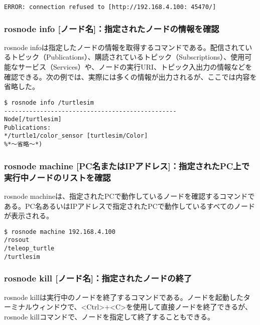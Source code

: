 \begin{lstlisting}[language=ROS]
ERROR: connection refused to [http://192.168.4.100: 45470/]
\end{lstlisting}

\subsubsection{rosnode info [ノード名]：指定されたノードの情報を確認}

rosnode infoは指定したノードの情報を取得するコマンドである。配信されているトピック（Publications）、購読されているトピック（Subscriptions）、使用可能なサービス（Services）や、ノードの実行URI、トピック入出力の情報などを確認できる。次の例では、実際には多くの情報が出力されるが、ここでは内容を省略した。

\begin{lstlisting}[language=ROS]
$ rosnode info /turtlesim
------------------------------------------------
Node[/turtlesim]
Publications:
*/turtle1/color_sensor [turtlesim/Color]
%*〜省略〜*)
\end{lstlisting}

\subsubsection{rosnode machine [PC名またはIPアドレス]：指定されたPC上で実行中ノードのリストを確認}

rosnode machineは、指定されたPCで動作しているノードを確認するコマンドである。PC名あるいはIPアドレスで指定されたPCで動作しているすべてのノードが表示される。

\begin{lstlisting}[language=ROS]
$ rosnode machine 192.168.4.100
/rosout
/teleop_turtle
/turtlesim
\end{lstlisting}

\subsubsection{rosnode kill [ノード名]：指定されたノードの終了}

rosnode killは実行中のノードを終了するコマンドである。ノードを起動したターミナルウィンドウで、<Ctrl>+<C>を使用して直接ノードを終了できるが、rosnode killコマンドで、ノードを指定して終了することもできる。

